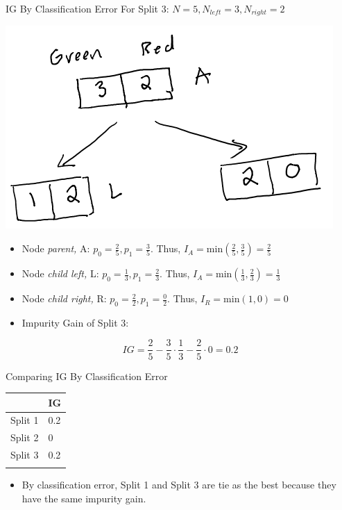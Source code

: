 \documentclass[
  ignorenonframetext,
]{beamer}
\providecommand{\tightlist}{%
  \setlength{\itemsep}{0pt}\setlength{\parskip}{0pt}}\usepackage{longtable,booktabs,array}
\begin{document}
\begin{frame}{IG By Classification Error}
\label{ig-by-classification-error-2}
For Split 3: \(N = 5, N_{left} =3, N_{right} = 2\)

\includegraphics{images/im2.png}

\begin{itemize}
\item
  Node \emph{parent,} A: \(p_0 = \frac{2}{5}, p_1 = \frac{3}{5}\). Thus,
  \(I_{A} = \text{min}(\frac{2}{5}, \frac{3}{5}) = \frac{2}{5}\)
\item
  Node \emph{child left,} L: \(p_0 = \frac{1}{3}, p_1 = \frac{2}{3}\).
  Thus, \(I_{A} = \text{min}(\frac{1}{3}, \frac{2}{3}) = \frac{1}{3}\)
\item
  Node \emph{child right,} R: \(p_0 = \frac{2}{2}, p_1 = \frac{0}{2}\).
  Thus, \(I_{R} = \text{min}(1,0) = 0\)
\item
  Impurity Gain of Split 3:
\end{itemize}

\[IG = \frac{2}{5} - \frac{3}{5} \cdot \frac{1}{3}-\frac{2}{5} \cdot 0 = 0.2\]
\end{frame}

\begin{frame}{Comparing IG By Classification Error}
\label{comparing-ig-by-classification-error}
\begin{longtable}[]{@{}ll@{}}
\toprule\noalign{}
& IG \\
\midrule\noalign{}
\endhead
Split 1 & 0.2 \\
Split 2 & 0 \\
Split 3 & 0.2 \\
\bottomrule\noalign{}
\end{longtable}

\begin{itemize}
\tightlist
\item
  By classification error, Split 1 and Split 3 are tie as the best
  because they have the same impurity gain.
\end{itemize}
\end{frame}
\end{document}
